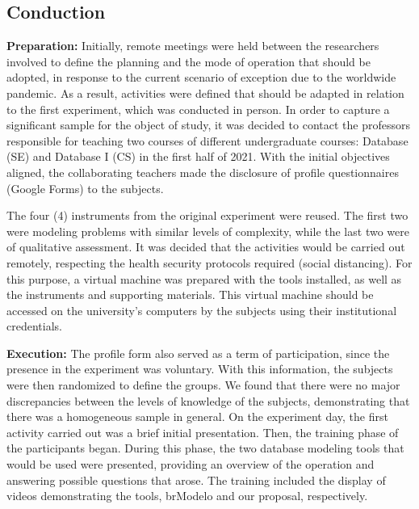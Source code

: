 \subsection{Conduction}
\label{ssec_experiments:preliminary_conduction}

\textbf{Preparation:} Initially, remote meetings were held between the researchers involved to define the planning and the mode of operation that should be adopted, in response to the current scenario of exception due to the worldwide pandemic.
As a result, activities were defined that should be adapted in relation to the first experiment, which was conducted in person.
In order to capture a significant sample for the object of study, it was decided to contact the professors responsible for teaching two courses of different undergraduate courses: Database (SE) and Database I (CS) in the first half of 2021.
With the initial objectives aligned, the collaborating teachers made the disclosure of profile questionnaires (Google Forms) to the subjects.

The four (4) instruments from the original experiment were reused. 
The first two were modeling problems with similar levels of complexity, while the last two were of qualitative assessment.
It was decided that the activities would be carried out remotely, respecting the health security protocols required (social distancing). 
For this purpose, a virtual machine was prepared with the tools installed, as well as the instruments and supporting materials. 
This virtual machine should be accessed on the university's computers by the subjects using their institutional credentials.

\textbf{Execution:} The profile form also served as a term of participation, since the presence in the experiment was voluntary.
With this information, the subjects were then randomized to define the groups.
We found that there were no major discrepancies between the levels of knowledge of the subjects, demonstrating that there was a homogeneous sample in general.
On the experiment day, the first activity carried out was a brief initial presentation.
Then, the training phase of the participants began.
During this phase, the two database modeling tools that would be used were presented, providing an overview of the operation and answering possible questions that arose.
The training included the display of videos demonstrating the tools, brModelo and our proposal, respectively.


